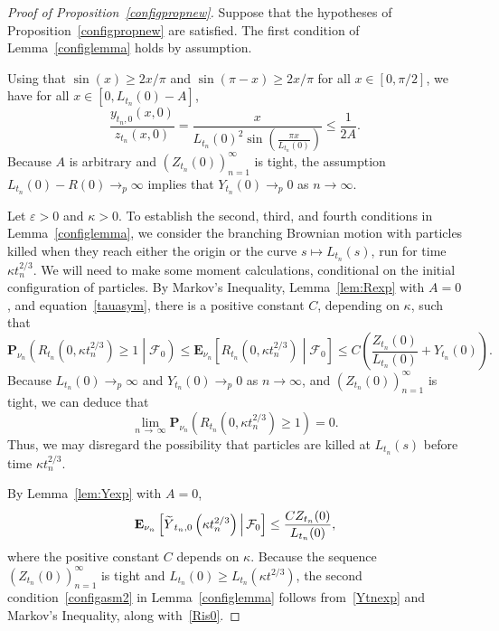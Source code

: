 \documentclass[10pt]{amsart}
\theoremstyle{definition}\newtheorem{defi}[theo]{Definition}\newtheorem{rema}[theo]{Remark}\newtheorem{exam}[theo]{Example}\newtheorem{exem}[theo]{Example}\newtheorem{nota}[theo]{Notation}
\newcommand*\eps{\varepsilon}
\newcommand*\E{\mathbf{E}}
\renewcommand*\P{\mathbf{P}}
\newcommand\F{\mathcal{F}}
\newcommand{\1} {\mathds{1}}
\let\oldtilde\tilde
\renewcommand*{\tilde}[1]{\mathchoice{\widetilde{#1}}{\widetilde{#1}}{\oldtilde{#1}}{\oldtilde{#1}}}
\begin{document}
\begin{proof}[Proof of Proposition~\ref{configpropnew}]
Suppose that the hypotheses of Proposition~\ref{configpropnew} are satisfied. The first condition of Lemma~\ref{configlemma} holds by assumption.

Using that $\sin(x) \geq 2x/\pi$ and $\sin(\pi - x) \geq 2x/\pi$ for all $x \in [0, \pi/2]$, we have for all $x \in [0, L_{t_n}(0) - A]$,
\begin{equation}\label{yzrat}
\frac{y_{t_n,0}(x,0)}{z_{t_n}(x,0)} = \frac{x}{L_{t_n}(0)^2 \sin\left(\frac{\pi x}{L_{t_n}(0)}\right)} \leq \frac{1}{2A}.
\end{equation}
Because $A$ is arbitrary and $(Z_{t_n}(0))_{n=1}^{\infty}$ is tight, the assumption $L_{t_n}(0) - R(0) \rightarrow_p \infty$ implies that $Y_{t_n}(0) \rightarrow_p 0$ as $n \rightarrow \infty$.

Let $\eps > 0$ and $\kappa > 0$. To establish the second, third, and fourth conditions in Lemma~\ref{configlemma}, we consider the branching Brownian motion with particles killed when they reach either the origin or the curve $s \mapsto L_{t_n}(s)$, run for time $\kappa t_n^{2/3}$. We will need to make some moment calculations, conditional on the initial configuration of particles. By Markov's Inequality, Lemma~\ref{lem:Rexp} with $A = 0$, and equation~\eqref{tauasym}, there is a positive constant $C$, depending on $\kappa$, such that
\[
\P_{\nu_n}\left(R_{t_n}\left(0, \kappa t_n^{2/3}\right) \geq 1\middle|\F_0\right) \leq \E_{\nu_n}\left[R_{t_n}\left(0, \kappa t_n^{2/3}\right)\middle|\F_0\right] \leq C \left(\frac{Z_{t_n}(0)}{L_{t_n}(0)} + Y_{t_n}(0) \right).
\]
Because $L_{t_n}(0) \rightarrow_p \infty$ and $Y_{t_n}(0) \rightarrow_p 0$ as $n \rightarrow \infty$, and $(Z_{t_n}(0))_{n=1}^{\infty}$ is tight, we can deduce that
\begin{equation}\label{Ris0}
\lim_{n\,\rightarrow\,\infty} \P_{\nu_n}\left(R_{t_n}\left(0, \kappa t_n^{2/3}\right) \geq 1\right) = 0.
\end{equation}
Thus, we may disregard the possibility that particles are killed at $L_{t_n}(s)$ before time $\kappa t_n^{2/3}$.

By Lemma~\ref{lem:Yexp} with $A = 0$,
\begin{equation}\label{Ytnexp}
\E_{\nu_n}\left[{\tilde Y}_{t_n,0}\left(\kappa t_n^{2/3}\right)\,\middle|\,\F_0\right] \leq \frac{C Z_{t_n}(0)}{L_{t_n}(0)},
\end{equation}
where the positive constant $C$ depends on $\kappa$. Because the sequence $(Z_{t_n}(0))_{n=1}^{\infty}$ is tight and $L_{t_n}(0) \geq L_{t_n}(\kappa t^{2/3})$, the second condition~\eqref{configasm2} in Lemma~\ref{configlemma} follows from~\eqref{Ytnexp} and Markov's Inequality, along with~\eqref{Ris0}.


\end{proof}
\end{document}
